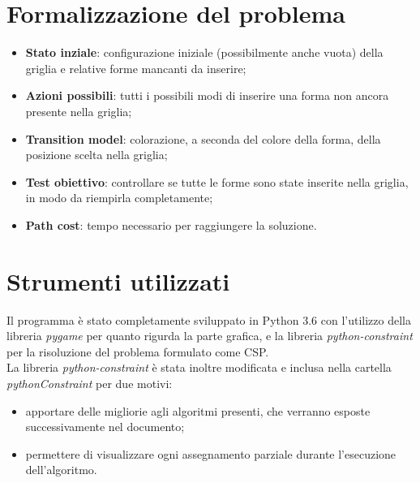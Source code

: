\section{Formalizzazione del problema}
\begin{itemize}
	\item \textbf{Stato inziale}: configurazione iniziale (possibilmente anche vuota) della griglia e relative forme mancanti da inserire;
	\item \textbf{Azioni possibili}: tutti i possibili modi di inserire una forma non ancora presente nella griglia;
	\item \textbf{Transition model}: colorazione, a seconda del colore della forma, della posizione scelta nella griglia;
	\item \textbf{Test obiettivo}: controllare se tutte le forme sono state inserite nella griglia, in modo da riempirla completamente;
	\item \textbf{Path cost}: tempo necessario per raggiungere la soluzione.
					
\end{itemize}

\section{Strumenti utilizzati}
Il programma è stato completamente sviluppato in Python 3.6 con l'utilizzo della libreria \textit{pygame} per quanto rigurda la parte grafica, e la libreria \textit{python-constraint} per la risoluzione del problema formulato come CSP. \\
La libreria \textit{python-constraint} è stata inoltre modificata e inclusa nella cartella \textit{pythonConstraint} per due motivi:
\begin{itemize}
	\item apportare delle migliorie agli algoritmi presenti, che verranno esposte successivamente nel documento;
	\item permettere di visualizzare ogni assegnamento parziale durante l'esecuzione dell'algoritmo.
\end{itemize}  

